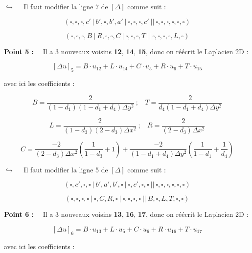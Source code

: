 \documentclass[12pt]{article}
\begin{document}
\vspace{5 mm}

$\hookrightarrow$~~ Il faut modifier la ligne 7 de $[\Delta]$ comme suit :

$$(\square,\square,\square,c'~|~b',\square,b',a'~|~\square,\square,\square,c'~||~\square,\square,\square,\square,\square,\square)$$

$$(\square,\square,\square,B~|~R,\square,\square,C~|~\square,\square,\square,T~||~\square,\square,\square,\square,L,\square)$$

\vspace{5 mm}

\noindent
\textbf{Point 5 :}~~ Il a 3 nouveaux voisins \textbf{12}, \textbf{14}, \textbf{15}, donc on réécrit le Laplacien 2D :

$$[\Delta u]_{5} = B \cdot u_{12} + L \cdot u_{14} + C \cdot u_{5} + R \cdot u_{6} + T \cdot u_{15}$$

\vspace{5 mm}
\noindent
avec ici les coefficients :

$$B = \frac{2}{(1-d_1)(1-d_1 + d_4)\Delta y^2}~;~~~~ T = \frac{2}{d_4(1-d_1 + d_4)\Delta y^2}$$

$$L = \frac{2}{(1-d_3)(2-d_3) \Delta x^2}~;~~~~ R = \frac{2}{(2-d_3) \Delta x^2}$$

$$C = \frac{-2}{(2-d_3) \Delta x^2} \left( \frac{1}{1-d_3} + 1 \right) + \frac{-2}{(1-d_1 + d_4)\Delta y^2} \left( \frac{1}{1-d_1} + \frac{1}{d_4} \right)$$

\vspace{5 mm}

$\hookrightarrow$~~ Il faut modifier la ligne 5 de $[\Delta]$ comme suit :

$$(\square,c',\square,\square~|~b',a',b',\square~|~\square,c',\square,\square~||~\square,\square,\square,\square,\square,\square)$$

$$(\square,\square,\square,\square~|~\square,C,R,\square~|~\square,\square,\square,\square~||~B,\square,L,T,\square,\square)$$

\vspace{5 mm}

\noindent
\textbf{Point 6 :}~~ Il a 3 nouveaux voisins \textbf{13}, \textbf{16}, \textbf{17}, donc on réécrit le Laplacien 2D :

$$[\Delta u]_{6} = B \cdot u_{13} + L \cdot u_{5} + C \cdot u_{6} + R \cdot u_{16} + T \cdot u_{17}$$

\vspace{5 mm}
\noindent
avec ici les coefficients :
\end{document}
